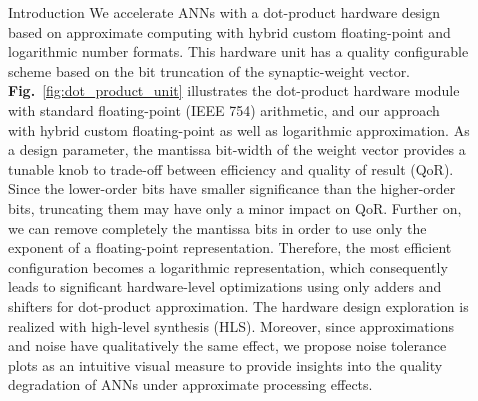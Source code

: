 \documentclass[final]{beamer}
\newlength{\sepwid}
\newlength{\onecolwid}
\newlength{\twocolwid}
\newcommand\fig[1]{\textbf{Fig.}~\ref{#1}}
\begin{document}
\begin{frame}[t]
\begin{columns}[t]
\begin{column}{\onecolwid}
\begin{block}{Introduction}
We accelerate ANNs with a dot-product hardware design based on approximate computing with hybrid custom floating-point and logarithmic number formats\cite{nevarez2021accelerating}. This hardware unit has a quality configurable scheme based on the bit truncation of the synaptic-weight vector. \fig{fig:dot_product_unit} illustrates the dot-product hardware module with standard floating-point (IEEE 754) arithmetic, and our approach with hybrid custom floating-point as well as logarithmic approximation. As a design parameter, the mantissa bit-width of the weight vector provides a tunable knob to trade-off between efficiency and quality of result (QoR)\cite{han2013approximate}. Since the lower-order bits have smaller significance than the higher-order bits, truncating them may have only a minor impact on QoR\cite{mittal2016survey}. Further on, we can remove completely the mantissa bits in order to use only the exponent of a floating-point representation. Therefore, the most efficient configuration becomes a logarithmic representation, which consequently leads to significant hardware-level optimizations using only adders and shifters for dot-product approximation. The hardware design exploration is realized with high-level synthesis (HLS). Moreover, since approximations and noise have qualitatively the same effect\cite{venkataramani2015approximate}, we propose noise tolerance plots as an intuitive visual measure to provide insights into the quality degradation of ANNs under approximate processing effects.

\end{block}

\end{column} %

\begin{column}{\sepwid}\end{column} %

\begin{column}{\twocolwid} %

\begin{columns}[t,totalwidth=\twocolwid] %

\begin{column}{\onecolwid}\vspace{-.6in} %



\end{column}
\end{columns}
\end{column}
\end{columns}
\end{frame}
\end{document}
